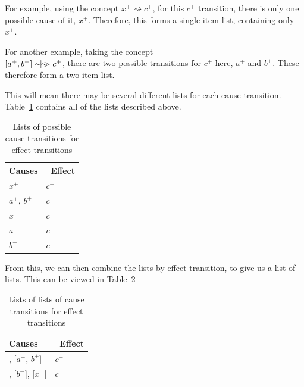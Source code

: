 \documentclass[british,conference,compsoc]{IEEEtran}
\begin{document}
For example, using the concept $x^{+} \rightsquigarrow c^{+}$, for this $c^{+}$ transition,
there is only one possible cause of it, $x^{+}$. Therefore, this forms a single item list, 
containing only $x^{+}$.

For another example, taking the concept\\$[a^{+}, b^{+}]\sim\hspace{-1.5mm}|\hspace{-1.5mm}\sim\hspace{-1.5mm}>c^{+}$, there are
two possible transitions for $c^{+}$ here, $a^{+}$ and $b^{+}$. These therefore form 
a two item list. 

This will mean there may be several different lists for each cause transition. 
Table~\ref{tab:list-of-concepts} contains all of the lists described above.

\begin{table}[h]
\caption{Lists of possible cause transitions for effect transitions\label{tab:list-of-concepts}}

  \centering
\begin{tabular}[htb]{| m{2.6cm} | m{2.0cm} |}
  \hline
Causes & \, Effect \\ \hline \hline
$x^{+}$ & $c^{+}$ \\ \hline
$a^{+}$, $b^{+}$ & $c^{+}$ \\ \hline
$x^{-}$ & $c^{-}$ \\ \hline
$a^{-}$ & $c^{-}$ \\ \hline
$b^{-}$ & $c^{-}$ \\ \hline
  \end{tabular}
\end{table}

\noindent From this, we can then combine the lists by effect transition, to give us a list of lists.
This can be viewed in Table~\ref{tab:list-of-lists}

\begin{table}[h]
\caption{Lists of lists of cause transitions for effect transitions\label{tab:list-of-lists}}

  \centering
\begin{tabular}[htb]{| m{2.6cm} | m{2.0cm} |}
  \hline
Causes & \, Effect \\ \hline \hline
[$x^{+}$], [$a^{+}$, $b^{+}$] & $c^{+}$ \\ \hline
[$a^{-}$], [$b^{-}$], [$x^{-}$] & $c^{-}$ \\ \hline

  \end{tabular}
\end{table}
\end{document}
